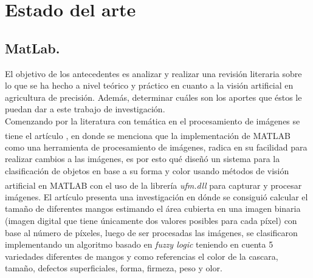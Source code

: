 \chapter{Estado del arte}

\section{MatLab.}
	El objetivo de los antecedentes es analizar y realizar una revisión literaria sobre lo  que  se  ha hecho  a  nivel  teórico  y  práctico  en  cuanto a  la visión artificial en agricultura de precisión.  Además,  determinar  cuáles son los aportes que éstos le puedan dar a este trabajo de investigación.\\
	
	Comenzando por la literatura con temática en el procesamiento de imágenes se tiene el artículo \cite{article3}, en donde se menciona que la implementación de MATLAB\textsuperscript{\textregistered} como una herramienta de procesamiento de imágenes, radica en su facilidad para realizar cambios a las imágenes, es por esto qué diseñó un sistema para la clasificación de objetos en base a su forma y color usando métodos de visión artificial en MATLAB\textsuperscript{\textregistered} con el uso de la librería \textit{ufm.dll} para capturar y procesar imágenes. El artículo \cite{inproceedings} presenta una investigación en dónde se consiguió calcular el tamaño de diferentes mangos estimando el área cubierta en una imagen binaria (imagen digital que tiene únicamente dos valores posibles para cada píxel) con base al número de píxeles, luego de ser procesadas las imágenes, se clasificaron implementando un algoritmo basado en \textit{fuzzy logic} teniendo en cuenta 5 variedades diferentes de mangos y como referencias el color de la cascara, tamaño, defectos superficiales, forma, firmeza, peso y olor.\\


